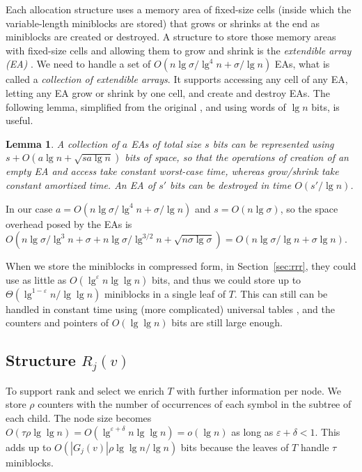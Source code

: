 \documentclass[11pt]{article}
\def\idrm#1{\ensuremath{\mathrm{#1}}}
\newtheorem{lemma}{Lemma}
\newcommand{\ra}{\idrm{rank}}
\newcommand{\sel}{\idrm{select}}
\newcommand{\eps}{\varepsilon}
\begin{document}
Each allocation structure uses a memory area of fixed-size cells (inside which 
the variable-length miniblocks are stored) that grows or shrinks at the end
as miniblocks are created or destroyed. A structure to store those memory
areas with fixed-size cells and allowing them to grow and shrink
is the {\em extendible array (EA)} \cite{RR03}. We need to handle a
set of $O(n\lg\sigma/\lg^4 n+\sigma/\lg n)$ EAs, what is called a 
{\em collection of extendible 
arrays}. It supports accessing any cell of any EA, letting
any EA grow or shrink by one cell, and create and destroy EAs. 
The following lemma,
simplified from the original \cite[Lemma 1]{RR03}, and using words of $\lg n$
bits, is useful.

\begin{lemma} \label{lem:EA}
A collection of $a$ EAs of total size $s$ bits can be represented using
$s + O(a \lg n + \sqrt{sa\lg n})$ bits of space, so that the operations of 
creation of an empty EA and access take constant worst-case time, whereas 
grow/shrink take constant amortized time. An EA of $s'$ bits can be destroyed 
in time $O(s'/\lg n)$.
\end{lemma}

In our case $a = O(n\lg\sigma/\lg^4 n+\sigma/\lg n)$ and $s=O(n\lg\sigma)$, so 
the space overhead posed by the EAs is 
$O(n\lg\sigma/\lg^3 n + \sigma +
   n\lg\sigma/\lg^{3/2} n + \sqrt{n\sigma\lg\sigma}) 
= O(n\lg\sigma/\lg n + \sigma\lg n)$.

When we store the miniblocks in compressed form, in 
Section~\ref{sec:rrr}, they could use as little as 
$O(\lg^\eps n\lg\lg n)$ bits, and thus we could store up to 
$\Theta(\lg^{1-\eps} n/\lg\lg n)$ miniblocks in a single leaf of $T$. 
This can still can be handled in constant time using (more complicated)
universal tables \cite{MN08}, and the counters and pointers of $O(\lg\lg n)$ 
bits are still large enough.

\subsection{Structure $R_j(v)$}

To support $\ra$ and $\sel$ we enrich $T$ with further information
per node. We store $\rho$ counters with the number
of occurrences of each symbol in the subtree of each child. The node size 
becomes $O(\tau\rho\lg\lg n) = O(\lg^{\eps+\delta}n\lg\lg n) = o(\lg n)$
as long as $\eps+\delta < 1$. This adds up to 
$O(|G_j(v)|\rho \lg\lg n / \lg n)$ bits because the leaves of $T$
handle $\tau$ miniblocks.
\end{document}
